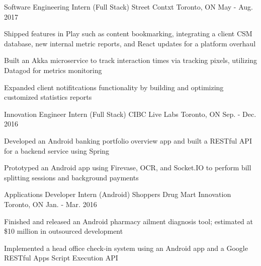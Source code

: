 \begin{cventries}
  \cventry
    {Software Engineering Intern (Full Stack)} %
    {Street Contxt} %
    {Toronto, ON} %
    {May - Aug. 2017} %
    {
      \begin{cvitems} %
        \item {Shipped features in Play such as content bookmarking, integrating a client CSM database, new internal metric reports, and React updates for a platform overhaul}
        \item {Built an Akka microservice to track interaction times via tracking pixels, utilizing Datagod for metrics monitoring}
        \item {Expanded client notifitcations functionality by building and optimizing customized statistics reports}
      \end{cvitems}
    }

  \cventry
    {Innovation Engineer Intern (Full Stack)} %
    {CIBC Live Labs} %
    {Toronto, ON} %
    {Sep. - Dec. 2016} %
    {
      \begin{cvitems} %
        \item {Developed an Android banking portfolio overview app and built a RESTful API for a backend service using Spring}
        \item {Prototyped an Android app using Firevase, OCR, and Socket.IO to perform bill splitting sessions and background payments}
      \end{cvitems}
    }

  \cventry
    {Applications Developer Intern (Android)} %
    {Shoppers Drug Mart Innovation} %
    {Toronto, ON} %
    {Jan. - Mar. 2016} %
    {
      \begin{cvitems} %
        \item {Finished and released an Android pharmacy ailment diagnosis tool; estimated at \$10 million in outsourced development}
        \item {Implemented a head office check-in system using an Android app and a Google RESTful Apps Script Execution API}
      \end{cvitems}
    }    
\end{cventries}
